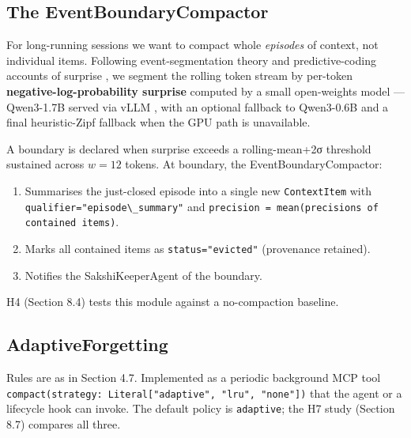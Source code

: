 \subsection{The EventBoundaryCompactor}\label{the-eventboundarycompactor}

For long-running sessions we want to compact whole \emph{episodes} of context, not individual items. Following event-segmentation theory \citep{zacks2007event, baldassano2017nested} and predictive-coding accounts of surprise \citep{rao1999predictive, friston2010fep, feldman2010precision}, we segment the rolling token stream by per-token \textbf{negative-log-probability surprise} computed by a small open-weights model --- Qwen3-1.7B served via vLLM \citep{kwon2023vllm, vllm2023, qwen2024technical}, with an optional fallback to Qwen3-0.6B and a final heuristic-Zipf fallback \citep{piantadosi2014zipf, shannon1948mathematical, mackay2003information} when the GPU path is unavailable.

A boundary is declared when surprise exceeds a rolling-mean+2σ threshold sustained across \(w=12\) tokens. At boundary, the EventBoundaryCompactor:

\begin{enumerate}
\def\labelenumi{\arabic{enumi}.}
\tightlist
\item
  Summarises the just-closed episode into a single new \passthrough{\lstinline!ContextItem!} with \passthrough{\lstinline!qualifier="episode\_summary"!} and \passthrough{\lstinline!precision = mean(precisions of contained items)!}.
\item
  Marks all contained items as \passthrough{\lstinline!status="evicted"!} (provenance retained).
\item
  Notifies the SakshiKeeperAgent of the boundary.
\end{enumerate}

H4 (Section 8.4) tests this module against a no-compaction baseline.

\subsection{AdaptiveForgetting}\label{adaptiveforgetting}

Rules are as in Section 4.7. Implemented as a periodic background MCP tool \passthrough{\lstinline!compact(strategy: Literal["adaptive", "lru", "none"])!} that the agent or a lifecycle hook can invoke. The default policy is \passthrough{\lstinline!adaptive!}; the H7 study (Section 8.7) compares all three.

